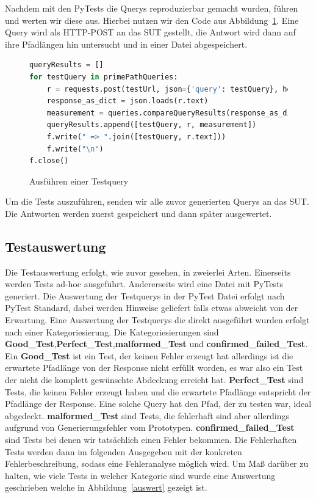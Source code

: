 Nachdem mit den PyTests die Querys reproduzierbar gemacht wurden, führen und werten wir diese aus.
Hierbei nutzen wir den Code aus Abbildung~\ref{testt}.
Eine Query wird als HTTP-POST an das SUT gestellt, die Antwort wird dann auf ihre Pfadlängen hin untersucht und in
einer Datei abgespeichert.

\begin{figure}[H]
    \begin{lstlisting}[language=Python]
queryResults = []
for testQuery in primePathQueries:
    r = requests.post(testUrl, json={'query': testQuery}, headers=HEADERS)
    response_as_dict = json.loads(r.text)
    measurement = queries.compareQueryResults(response_as_dict, testQuery)
    queryResults.append([testQuery, r, measurement])
    f.write(" => ".join([testQuery, r.text]))
    f.write("\n")
f.close()
    \end{lstlisting}
    \caption{Ausführen einer Testquery}
    \label{testt}
\end{figure}

Um die Tests auszuführen, senden wir alle zuvor generierten Querys an das SUT.
Die Antworten werden zuerst gespeichert und dann später ausgewertet.

\subsection{Testauswertung}

Die Testauswertung erfolgt, wie zuvor gesehen, in zweierlei Arten.
Einerseits werden Tests ad-hoc ausgeführt.
Andererseits wird eine Datei mit PyTests generiert.
Die Auswertung der Testquerys in der PyTest Datei erfolgt nach PyTest Standard, dabei werden Hinweise geliefert falls etwas abweicht von der Erwartung.
Eine Auswertung der Testquerys die direkt ausgeführt wurden erfolgt nach einer Kategoriesierung.
Die Kategoriesierungen sind \textbf{Good\_Test},\textbf{Perfect\_Test},\textbf{malformed\_Test} und \textbf{confirmed\_failed\_Test}.
Ein \textbf{Good\_Test} ist ein Test, der keinen Fehler erzeugt hat allerdings ist die erwartete Pfadlänge von der Response nicht erfüllt worden, es war also ein Test
der nicht die komplett gewünschte Abdeckung erreicht hat.
\textbf{Perfect\_Test} sind Tests, die keinen Fehler erzeugt haben und die erwartete Pfadlänge entspricht der Pfadlänge der Response.
Eine solche Query hat den Pfad, der zu testen war, ideal abgedeckt.
\textbf{malformed\_Test} sind Tests, die fehlerhaft sind aber allerdings aufgrund von Generierungsfehler vom Prototypen.
\textbf{confirmed\_failed\_Test} sind Tests bei denen wir tatsächlich einen Fehler bekommen.
Die Fehlerhaften Tests werden dann im folgenden Ausgegeben mit der konkreten Fehlerbeschreibung, sodass eine Fehleranalyse möglich wird.
Um Maß darüber zu halten, wie viele Tests in welcher Kategorie sind wurde eine Auswertung geschrieben welche in Abbildung~\ref{auswert} gezeigt ist.

